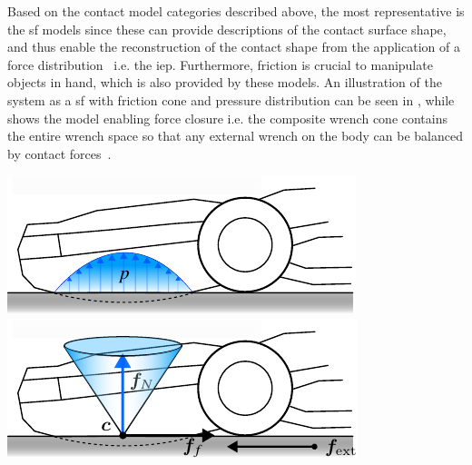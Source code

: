Based on the contact model categories described above, the most representative is the \gls{sf} models since these can provide descriptions of the contact surface shape, and thus enable the reconstruction of the contact shape from the application of a force distribution~\cite{contact-mechanics} i.e. the \gls{iep}. Furthermore, friction is crucial to manipulate objects in hand, which is also provided by these models. An illustration of the system as a \gls{sf} with friction cone and pressure distribution can be seen in , while  shows the model enabling force closure i.e. the composite wrench cone contains the entire wrench space so that any external wrench  on the body can be balanced by contact forces~\cite{modern-robotics-mechanics-planning-and-control}.
%
\begin{center}
    \renewcommand{\arraystretch}{1.2}
    \begin{minipage}{.48\linewidth}
        \vspace{0pt}
        \centering
        \includegraphics[width=.95\textwidth]{chapters/modeling/fig/contact-surface.pdf}%
        \vspace{0.6cm}
        \includegraphics[width=.95\textwidth]{chapters/modeling/fig/friction-cone-schematic.pdf}%
    \end{minipage}%
    \hfill%
    \begin{minipage}{.48\linewidth}
        \vspace{0pt}
        \centering

\end{minipage}
\end{center}
